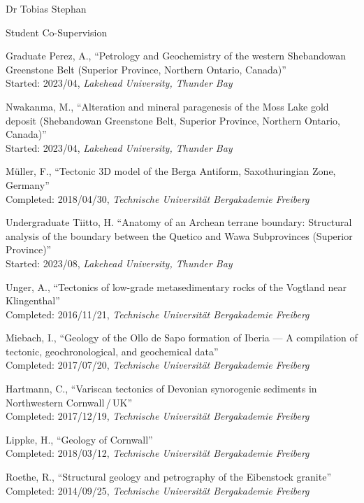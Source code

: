 \documentclass[10pt, paper=letter]{scrartcl} %
\begin{document}
\begin{cv}{Dr Tobias Stephan}
\begin{cvlist}{Student Co-Supervision}
\item[Graduate] Perez, A., \enquote{Petrology and Geochemistry of the western Shebandowan Greenstone Belt (Superior Province, Northern Ontario, Canada)}\\
    Started: 2023/04, \textit{Lakehead University, Thunder Bay}
\item[] Nwakanma, M., \enquote{Alteration and mineral paragenesis of the Moss Lake gold deposit (Shebandowan Greenstone Belt, Superior Province, Northern Ontario, Canada)}\\
    Started: 2023/04, \textit{Lakehead University, Thunder Bay}
\item[] Müller, F., \enquote{Tectonic 3D model of the Berga Antiform, Saxothuringian Zone, Germany}\\
    Completed: 2018/04/30, \textit{Technische Universität Bergakademie Freiberg}
    
\item[Undergraduate] Tiitto, H. \enquote{Anatomy of an Archean terrane boundary: Structural analysis of the boundary between the Quetico and Wawa Subprovinces (Superior Province)}\\
Started: 2023/08, \textit{Lakehead University, Thunder Bay}
\item[] Unger, A., \enquote{Tectonics of low-grade metasedimentary rocks of the Vogtland near Kling\-en\-thal}\\
    Completed: 2016/11/21, \textit{Technische Universität Bergakademie Freiberg}
\item[] Miebach, I., \enquote{Geology of the Ollo de Sapo formation of Iberia --- A compilation of tectonic, geochronological, and geochemical data}\\
    Completed: 2017/07/20, \textit{Technische Universität Bergakademie Freiberg}
\item[] Hartmann, C., \enquote{Variscan tectonics of Devonian synorogenic sediments in Northwestern Cornwall\,/\,UK}\\
    Completed: 2017/12/19, \textit{Technische Universität Bergakademie Freiberg}
\item[] Lippke, H., \enquote{Geology of Cornwall}\\
    Completed: 2018/03/12, \textit{Technische Universität Bergakademie Freiberg}
\item[] Roethe, R., \enquote{Structural geology and petrography of the Eibenstock granite}\\
    Completed: 2014/09/25, \textit{Technische Universität Bergakademie Freiberg}
\end{cvlist}


\end{cv}
\end{document}
